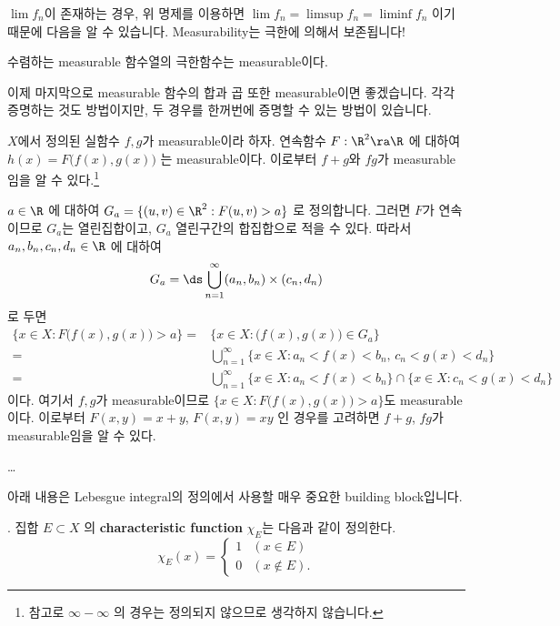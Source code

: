 \(\lim f_n\)이 존재하는 경우, 위 명제를 이용하면 \(\lim f_n = \limsup f_n = \liminf f_n\) 이기 때문에 다음을 알 수 있습니다. Measurability는 극한에 의해서 보존됩니다!

\cor 수렴하는 measurable 함수열의 극한함수는 measurable이다.

이제 마지막으로 measurable 함수의 합과 곱 또한 measurable이면 좋겠습니다. 각각 증명하는 것도 방법이지만, 두 경우를 한꺼번에 증명할 수 있는 방법이 있습니다.

 \(X\)에서 정의된 실함수 \(f, g\)가 measurable이라 하자. 연속함수 \(F: \R^2 \ra \R\) 에 대하여 \(h(x) = F\big(f(x), g(x)\big)\) 는 measurable이다. 이로부터 \(f + g\)와 \(fg\)가 measurable임을 알 수 있다.\footnote{참고로 \(\infty - \infty\) 의 경우는 정의되지 않으므로 생각하지 않습니다.}

\pf \(a \in \R\) 에 대하여 \(G_a = \{(u, v)\in \R^2 : F(u, v) > a\}\) 로 정의합니다. 그러면 \(F\)가 연속이므로 \(G_a\)는 열린집합이고, \(G_a\) 열린구간의 합집합으로 적을 수 있다. 따라서 \(a_n, b_n, c_n, d_n\in \R\) 에 대하여
\[
    G_a = \ds \bigcup_{n=1}^{\infty} (a_n, b_n) \times (c_n, d_n)
\]
로 두면
\[
    \begin{aligned}
        \{x \in X : F\bigl(f(x), g(x)\bigr) > a\} = & \{x \in X : \bigl(f(x), g(x)\bigr) \in G_a\}                                              \\
        =                                           & \bigcup_{n=1}^{\infty} \{x \in X : a_n < f(x) < b_n,\, c_n < g(x) < d_n\}                 \\
        =                                           & \bigcup_{n=1}^{\infty} \{x \in X : a_n < f(x) < b_n\} \cap \{x \in X : c_n < g(x) < d_n\}
    \end{aligned}
\]
이다. 여기서 \(f, g\)가 measurable이므로 \(\{x \in X : F\bigl(f(x), g(x)\bigr) > a\}\)도 measurable이다. 이로부터 \(F(x, y) = x + y\), \(F(x, y) = xy\) 인 경우를 고려하면 \(f+g\), \(fg\)가 measurable임을 알 수 있다.

\dots

아래 내용은 Lebesgue integral의 정의에서 사용할 매우 중요한 building block입니다.

.  집합 \(E \subset X\) 의 \textbf{characteristic function} \(\chi_E\)는 다음과 같이 정의한다.
\[
    \chi_E(x) = \begin{cases}
        1 & (x\in E) \\ 0 & (x \notin E).
    \end{cases}
\]

